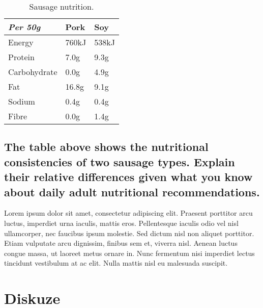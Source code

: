 \documentclass[11pt]{scrartcl} %
\begin{document}
\begin{table}[h] %
	\centering %
	\begin{tabular}{l l l}
		\toprule
		\textit{Per 50g} & \textbf{Pork} & \textbf{Soy} \\
		\midrule
		Energy & 760kJ & 538kJ\\
		Protein & 7.0g & 9.3g\\
		Carbohydrate & 0.0g & 4.9g\\
		Fat & 16.8g & 9.1g\\
		Sodium & 0.4g & 0.4g\\
		Fibre & 0.0g & 1.4g\\
		\bottomrule
	\end{tabular}
	\caption{Sausage nutrition.}
\end{table}


\subsection{The table above shows the nutritional consistencies of two sausage types. Explain their relative differences given what you know about daily adult nutritional recommendations.}

Lorem ipsum dolor sit amet, consectetur adipiscing elit. Praesent porttitor arcu luctus, imperdiet urna iaculis, mattis eros. Pellentesque iaculis odio vel nisl ullamcorper, nec faucibus ipsum molestie. Sed dictum nisl non aliquet porttitor. Etiam vulputate arcu dignissim, finibus sem et, viverra nisl. Aenean luctus congue massa, ut laoreet metus ornare in. Nunc fermentum nisi imperdiet lectus tincidunt vestibulum at ac elit. Nulla mattis nisl eu malesuada suscipit.


\section{Diskuze}


\end{document}
